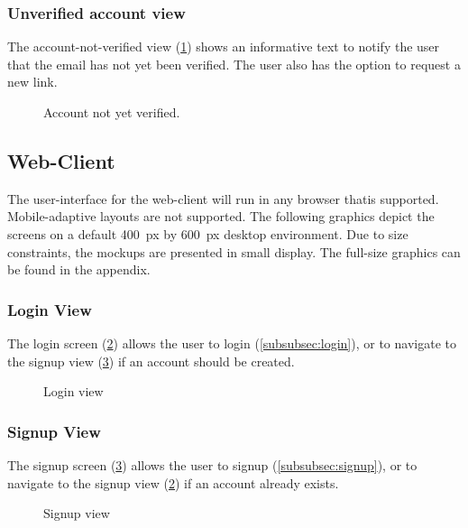 \subsubsection{Unverified account view}
The account-not-verified view (\ref{fig:ex-account-not-verified-view}) shows an informative text to notify the user that the email has not yet been verified.
The user also has the option to request a new link.

\begin{figure}
    \centering

    \caption{Account not yet verified.}
    \label{fig:ex-account-not-verified-view}
\end{figure}

\subsection{Web-Client}\label{subsec:web-client}
The user-interface for the web-client will run in any browser thatis supported.
Mobile-adaptive layouts are not supported.
The following graphics depict the screens on a default \SI{400}{px} by \SI{600}{px} desktop environment.
Due to size constraints, the mockups are presented in small display.
The full-size graphics can be found in the appendix.

\subsubsection{Login View}
The login screen (\ref{fig:web-login-view}) allows the user to login (\ref{subsubsec:login}), or to navigate to the signup view (\ref{fig:web-signup-view}) if an account should be created.
\begin{figure}
    \centering

    \caption{Login view}
    \label{fig:web-login-view}
\end{figure}

\subsubsection{Signup View}
The signup screen (\ref{fig:web-signup-view}) allows the user to signup (\ref{subsubsec:signup}), or to navigate to the signup view (\ref{fig:web-login-view}) if an account already exists.
\begin{figure}
    \centering

    \caption{Signup view}
    \label{fig:web-signup-view}
\end{figure}

